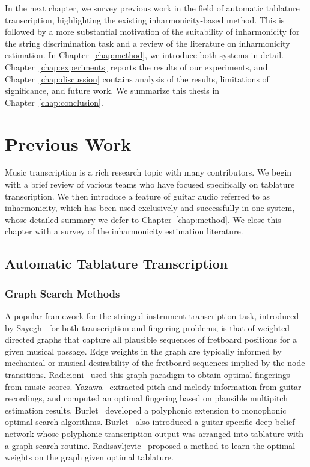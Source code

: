 \documentclass[12pt]{cmuthesis}
\begin{document}
In the next chapter, we survey previous work in the field of automatic tablature transcription, highlighting the existing inharmonicity-based method. This is followed by a more substantial motivation of the suitability of inharmonicity for the string discrimination task and a review of the literature on inharmonicity estimation. In Chapter~\ref{chap:method}, we introduce both systems in detail. Chapter~\ref{chap:experiments} reports the results of our experiments, and Chapter~\ref{chap:discussion} contains analysis of the results, limitations of significance, and future work. We summarize this thesis in Chapter~\ref{chap:conclusion}.

\noindent
\chapter{Previous Work}
\label{chap:lit-review}
Music transcription is a rich research topic with many contributors. We begin with a brief review of various teams who have focused specifically on tablature transcription. We then introduce a feature of guitar audio referred to as inharmonicity, which has been used exclusively and successfully in one system, whose detailed summary we defer to Chapter~\ref{chap:method}. We close this chapter with a survey of the inharmonicity estimation literature.

\section{Automatic Tablature Transcription}
\subsection{Graph Search Methods}
A popular framework for the stringed-instrument transcription task, introduced by Sayegh~\cite{sayegh1989} for both transcription and fingering problems, is that of weighted directed graphs that capture all plausible sequences of fretboard positions for a given musical passage. Edge weights in the graph are typically informed by mechanical or musical desirability of the fretboard sequences implied by the node transitions. Radicioni~\cite{radicioni2005} used this graph paradigm to obtain optimal fingerings from music scores. Yazawa~\cite{yazawa2013} extracted pitch and melody information from guitar recordings, and computed an optimal fingering based on plausible multipitch estimation results. Burlet~\cite{burlet2013} developed a polyphonic extension to monophonic optimal search algorithms. Burlet~\cite{burlet2015} also introduced a guitar-specific deep belief network whose polyphonic transcription output was arranged into tablature with a graph search routine. Radisavljevic~\cite{radisav2004} proposed a method to learn the optimal weights on the graph given optimal tablature.
\end{document}
